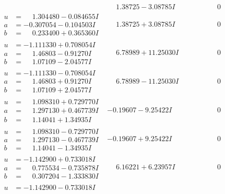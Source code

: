 \documentclass[1p]{elsarticle_modified}
\theoremstyle{definition}
\begin{document}
$$\begin{array}{c|c|c}
 & \phantom{-}1.38725 - 3.08785 I & \phantom{-0.000000 } 0 \\ \hline\begin{aligned}
u &= \phantom{-}1.304480 - 0.084655 I \\
a &= -0.307054 - 0.104503 I \\
b &= \phantom{-}0.233400 + 0.365360 I\end{aligned}
 & \phantom{-}1.38725 + 3.08785 I & \phantom{-0.000000 } 0 \\ \hline\begin{aligned}
u &= -1.111330 + 0.708054 I \\
a &= \phantom{-}1.46803 - 0.91270 I \\
b &= \phantom{-}1.07109 - 2.04577 I\end{aligned}
 & \phantom{-}6.78989 + 11.25030 I & \phantom{-0.000000 } 0 \\ \hline\begin{aligned}
u &= -1.111330 - 0.708054 I \\
a &= \phantom{-}1.46803 + 0.91270 I \\
b &= \phantom{-}1.07109 + 2.04577 I\end{aligned}
 & \phantom{-}6.78989 - 11.25030 I & \phantom{-0.000000 } 0 \\ \hline\begin{aligned}
u &= \phantom{-}1.098310 + 0.729770 I \\
a &= \phantom{-}1.297130 + 0.467739 I \\
b &= \phantom{-}1.14041 + 1.34935 I\end{aligned}
 & -0.19607 - 9.25422 I & \phantom{-0.000000 } 0 \\ \hline\begin{aligned}
u &= \phantom{-}1.098310 - 0.729770 I \\
a &= \phantom{-}1.297130 - 0.467739 I \\
b &= \phantom{-}1.14041 - 1.34935 I\end{aligned}
 & -0.19607 + 9.25422 I & \phantom{-0.000000 } 0 \\ \hline\begin{aligned}
u &= -1.142900 + 0.733018 I \\
a &= \phantom{-}0.775534 - 0.735878 I \\
b &= \phantom{-}0.307204 - 1.333830 I\end{aligned}
 & \phantom{-}6.16221 + 6.23957 I & \phantom{-0.000000 } 0 \\ \hline\begin{aligned}
u &= -1.142900 - 0.733018 I \\

\end{aligned}
\end{array}$$
\end{document}

